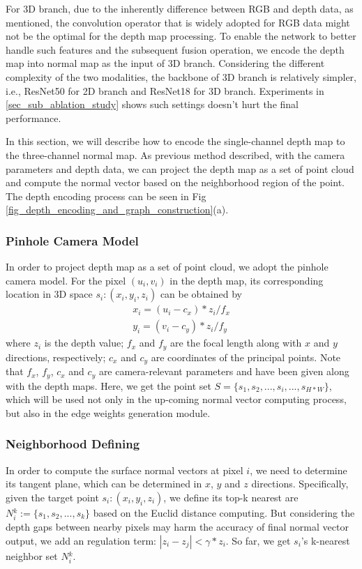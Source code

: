 ﻿\documentclass[journal]{IEEEtran}
\begin{document}
     
    For 3D branch, due to the inherently difference between RGB and depth data, as \cite{2021shapeconv} mentioned, the convolution operator that is widely adopted for RGB data might not be the optimal for the depth map processing. To enable the network to better handle such features and the subsequent fusion operation, we encode the depth map into normal map as the input of 3D branch. Considering the different complexity of the two modalities, the backbone of 3D branch is relatively simpler, i.e., ResNet50 for 2D branch and ResNet18 for 3D branch. Experiments in \ref{sec_sub_ablation_study} shows such settings doesn't hurt the final performance. 

 
    In this section, we will describe how to encode the single-channel depth map to the three-channel normal map. As previous method \cite{yin2018geonet} described, with the camera parameters and depth data, we can project the depth map as a set of point cloud and compute the normal vector based on the neighborhood region of the point. The depth encoding process can be seen in Fig \ref{fig_depth_encoding_and_graph_construction}(a).
 
    \subsubsection{Pinhole Camera Model}  In order to project depth map as a set of point cloud, we adopt the pinhole camera model. For the pixel $(u_{i},v_{i})$ in the depth map, its corresponding location in 3D space $\mathit{s_{i}}:(x_{i},y_{i},z_{i})$ can be obtained by
    \begin{equation}
        \begin{split}
        x_{i} = (u_{i} - c_{x})*z_{i}/f_{x}\\
        y_{i} = (v_{i} - c_{y})*z_{i}/f_{y}
        \end{split}
    \end{equation}
    where $z_{i}$ is the depth value; $f_{x}$ and $f_{y}$ are the focal length along with $x$ and $y$ directions, respectively; $c_{x}$ and $c_{y}$ are coordinates of the principal points. Note that $f_{x}$, $f_{y}$, $c_{x}$ and $c_{y}$ are camera-relevant parameters and have been given along with the depth maps. Here, we get the point set ${S}=\{ {s_{1}}, {s_{2}}, ..., {s_{i}} , ...  , {s_{H*W}} \}$, which will be used not only in the up-coming normal vector computing process, but also in the edge weights generation module. 
    
 
    \subsubsection{Neighborhood Defining}  In order to compute the surface normal vectors at pixel $i$, we need to determine its tangent plane, which can be determined in $x$, $y$ and $z$ directions. Specifically, given the target point ${s_{i}}:(x_{i},y_{i},z_{i})$, we define its top-k nearest are $N{_i^k}:=  \{ s_{1}, s_{2}, ..., s_k\}$ based on the Euclid distance computing. But considering the depth gaps between nearby pixels may harm the accuracy of final normal vector output, we add an regulation term: $ |z_{i} - z_{j} | < \gamma *z_{i} $. So far, we get ${s_{i}}$'s k-nearest neighbor set $N{_i^k}$. 
    
\end{document}
